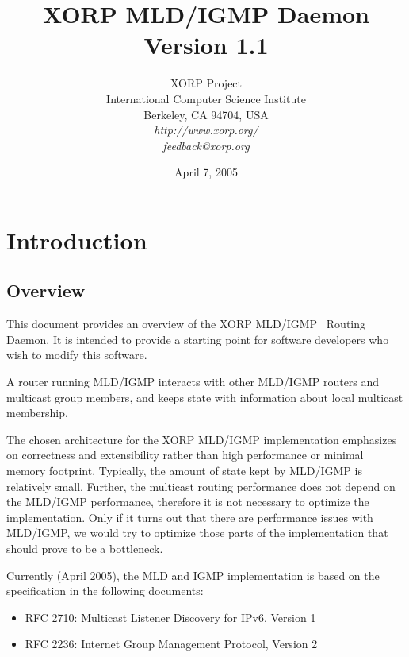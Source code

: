 \documentclass[11pt]{article}
\begin{document}
\title{XORP MLD/IGMP Daemon \\
\vspace{1ex}
Version 1.1}
\author{ XORP Project					\\
	 International Computer Science Institute	\\
	 Berkeley, CA 94704, USA			\\
         {\it http://www.xorp.org/}			\\
	 {\it feedback@xorp.org}
}
\date{April 7, 2005}

\maketitle

\thispagestyle{empty}


\section{Introduction}


\subsection{Overview}

This document provides an overview of the XORP MLD/IGMP~\cite{MLD-V1,IGMP-V2}
Routing Daemon. It is intended to provide a starting point for software
developers who wish to modify this software.

A router running MLD/IGMP interacts with other MLD/IGMP routers and
multicast group members, and keeps state with information about local
multicast membership.

The chosen architecture for the XORP MLD/IGMP implementation emphasizes on
correctness and extensibility rather than high performance or minimal
memory footprint. Typically, the amount of state kept by MLD/IGMP is
relatively small. Further, the multicast routing performance does not
depend on the MLD/IGMP performance, therefore it is not necessary to
optimize the implementation. Only if it turns out that there are
performance issues with MLD/IGMP, we would try to optimize those parts of the
implementation that should prove to be a bottleneck.

Currently (April 2005), the MLD and IGMP implementation is based
on the specification in the following documents:

\begin{itemize}
  \item RFC 2710: Multicast Listener Discovery for IPv6, Version 1
  \item RFC 2236: Internet Group Management Protocol, Version 2
\end{itemize}
\end{document}
